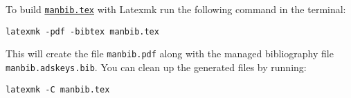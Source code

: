 To build \href{./manbib.tex}{\texttt{manbib.tex}} with Latexmk run the
following command in the terminal:

\begin{verbatim}
latexmk -pdf -bibtex manbib.tex
\end{verbatim}

This will create the file \texttt{manbib.pdf} along with the managed
bibliography file \texttt{manbib.adskeys.bib}. You can clean up the
generated files by running:

\begin{verbatim}
latexmk -C manbib.tex
\end{verbatim}
